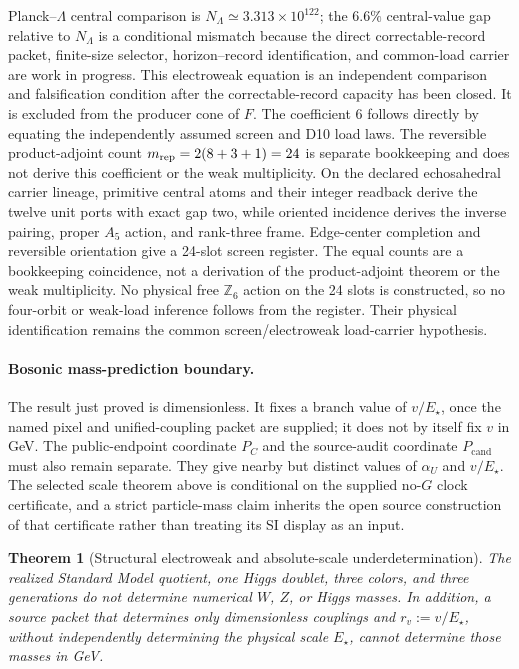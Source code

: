 \documentclass[11pt]{article}
\newtheorem{theorem}{Theorem}[section]
\begin{document}
Planck--\(\Lambda\) central comparison is \(N_{\Lambda}\simeq3.313\times10^{122}\); the
\(6.6\%\) central-value gap relative to \(N_{\Lambda}\) is a conditional mismatch because the
direct correctable-record packet, finite-size selector, horizon--record identification, and common-load carrier are work in progress.
This electroweak equation is an independent comparison and falsification
condition after the correctable-record capacity has been closed. It is excluded from the producer
cone of \(F\).
The coefficient \(6\) follows directly by equating the independently assumed
screen and D10 load laws. The reversible product-adjoint count
\(m_{\rm rep}=2(8+3+1)=24\) is separate bookkeeping and does not derive this
coefficient or the weak multiplicity. On the declared echosahedral carrier
lineage, primitive central atoms and their integer readback derive the twelve
unit ports with exact gap two, while oriented incidence derives the inverse
pairing, proper \(A_5\) action, and rank-three frame. Edge-center completion
and reversible orientation give a 24-slot screen register. The equal counts are a
bookkeeping coincidence, not a derivation of the product-adjoint theorem or the
weak multiplicity. No physical free \(\mathbb Z_6\) action on the 24 slots is
constructed, so no four-orbit or weak-load inference follows from the register.
Their physical identification remains the common screen/electroweak
load-carrier hypothesis.

\paragraph{Bosonic mass-prediction boundary.}
The result just proved is dimensionless.  It fixes a branch value of
\(v/E_\star\), once the named pixel and unified-coupling packet are supplied;
it does not by itself fix \(v\) in GeV.  The public-endpoint coordinate
\(P_C\) and the source-audit coordinate \(P_{\mathrm{cand}}\) must also remain
separate.  They give nearby but distinct values of \(\alpha_U\) and
\(v/E_\star\).  The selected scale theorem above is conditional on the
supplied no-\(G\) clock certificate, and a strict particle-mass claim inherits
the open source construction of that certificate rather than treating its SI
display as an input.

\begin{theorem}[Structural electroweak and absolute-scale
underdetermination]\label{thm:boson-structural-scale-no-go}
The realized Standard Model quotient, one Higgs doublet, three colors, and
three generations do not determine numerical \(W\), \(Z\), or Higgs masses.
In addition, a source packet that determines only dimensionless couplings and
\(r_v:=v/E_\star\), without independently determining the physical scale
\(E_\star\), cannot determine those masses in GeV.
\end{theorem}
\end{document}
